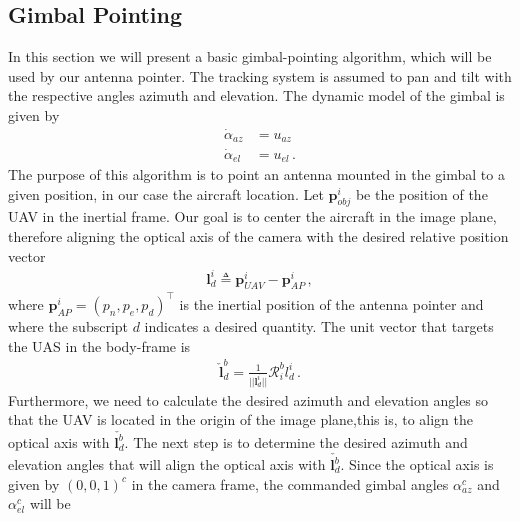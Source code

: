 \subsection{Gimbal Pointing}{\label{sub:gimbal_pointing}}
In this section we will present a basic gimbal-pointing algorithm, which will be used by our antenna pointer. The tracking system is assumed to pan and tilt with the respective angles azimuth and elevation. The dynamic model of the gimbal is given by
\begin{align*}
\dot{\alpha}_{az}&=u_{az} \\
\dot{\alpha}_{el}&=u_{el}\,.
\end{align*}
The purpose of this algorithm is to point an antenna mounted in the gimbal to a given position, in our case the aircraft location. Let $\boldsymbol{p}_{obj}^i$ be the position of the UAV in the inertial frame. Our goal is to center the aircraft in the image plane, therefore aligning the optical axis of the camera with the desired relative position vector
\begin{align*}
\boldsymbol{l}_{d}^i\triangleq \boldsymbol{p}_{UAV}^i-\boldsymbol{p}_{AP}^i\,,
\end{align*}
where $\boldsymbol{p}_{AP}^i = (p_n,p_e,p_d)^\top$ is the inertial position of the antenna pointer and where the subscript $d$ indicates a desired quantity. The unit vector that targets the UAS in the body-frame is
\begin{align*}
\check{\boldsymbol{l}}_d^b=\frac{1}{\lvert\lvert \boldsymbol{l}_d^i\rvert\rvert}\mathcal{R}_i^bl_d^i\,.
\end{align*}
Furthermore, we need to calculate the desired azimuth and elevation angles so that the UAV is located in the origin of the image plane,this is, to align the optical axis with $\check{\boldsymbol{l}_d^b}$.
The next step is to determine the desired azimuth and elevation angles that will align the optical axis with $\check{\boldsymbol{l}_d^b}$. Since the optical axis is given by $(0,0,1)^c$ in the camera frame, the commanded gimbal angles $\alpha_{az}^c$ and $\alpha_{el}^c$ will be
